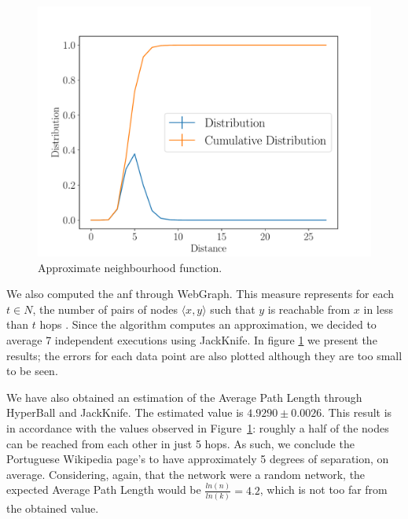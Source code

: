 \documentclass[9pt,a4paper,twocolumn,notitlepage]{article}
\begin{document}
\begin{figure}[h]
	\centering
	\includegraphics[width=\linewidth]{wikipedia_pt_neighbourhood_function.pdf}
	\caption{Approximate neighbourhood function.}
	\label{fig:neighfun}
\end{figure}

We also computed the \acrfull{anf} through WebGraph. This measure represents for each $t \in N$, the number of pairs of nodes $ \langle x, y \rangle $ such that $y$ is reachable from $x$ in less than $t$ hops \cite{Boldi2011HyperANFAT}. Since the algorithm computes an approximation, we decided to average 7 independent executions using JackKnife.
In figure \ref{fig:neighfun} we present the results; the errors for each data point are also plotted although they are too small to be seen.

We have also obtained an estimation of the Average Path Length through HyperBall\cite{DBLP:conf/icdm/BoldiV13} and JackKnife. The estimated value is $ 4.9290 \pm 0.0026 $. This result is in accordance with the values observed in Figure~\ref{fig:neighfun}: roughly a half of the nodes can be reached from each other in just 5 hops. As such, we conclude the Portuguese Wikipedia page's to have approximately 5 degrees of separation, on average. Considering, again, that the network were a random network, the expected Average Path Length would be $\frac{ln(n)}{ln(k)} = 4.2$, which is not too far from the obtained value.
\end{document}
